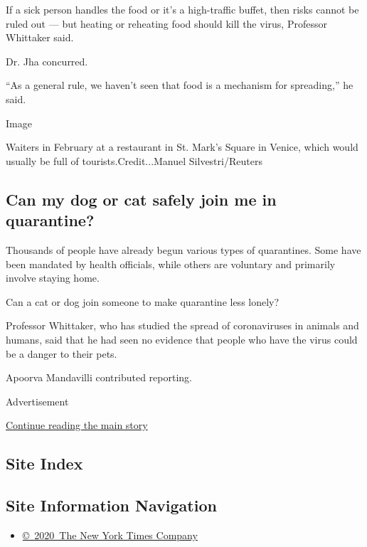 If a sick person handles the food or it's a high-traffic buffet, then
risks cannot be ruled out --- but heating or reheating food should kill
the virus, Professor Whittaker said.

Dr. Jha concurred.

``As a general rule, we haven't seen that food is a mechanism for
spreading,'' he said.

Image

Waiters in February at a restaurant in St. Mark's Square in Venice,
which would usually be full of tourists.Credit...Manuel
Silvestri/Reuters

\hypertarget{can-my-dog-or-cat-safely-join-me-in-quarantine}{%
\subsection{Can my dog or cat safely join me in
quarantine?}\label{can-my-dog-or-cat-safely-join-me-in-quarantine}}

Thousands of people have already begun various types of quarantines.
Some have been mandated by health officials, while others are voluntary
and primarily involve staying home.

Can a cat or dog join someone to make quarantine less lonely?

Professor Whittaker, who has studied the spread of coronaviruses in
animals and humans, said that he had seen no evidence that people who
have the virus could be a danger to their pets.

Apoorva Mandavilli contributed reporting.

Advertisement

\protect\hyperlink{after-bottom}{Continue reading the main story}

\hypertarget{site-index}{%
\subsection{Site Index}\label{site-index}}

\hypertarget{site-information-navigation}{%
\subsection{Site Information
Navigation}\label{site-information-navigation}}

\begin{itemize}
\tightlist
\item
  \href{https://help.nytimes.com/hc/en-us/articles/115014792127-Copyright-notice}{©~2020~The
  New York Times Company}
\end{itemize}

